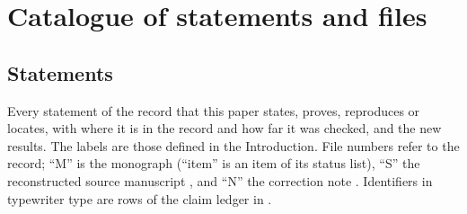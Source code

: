 \section{Catalogue of statements and files}\label{app:catalogue}

\subsection{Statements}

Every statement of the record that this paper states, proves, reproduces or locates, with where it is in the record and how far it was checked, and the new results. The labels are those defined in the Introduction. File numbers refer to the record; ``M'' is the monograph  (``item'' is an item of its status list), ``S'' the reconstructed source manuscript , and ``N'' the correction note . Identifiers in typewriter type are rows of the claim ledger in .

